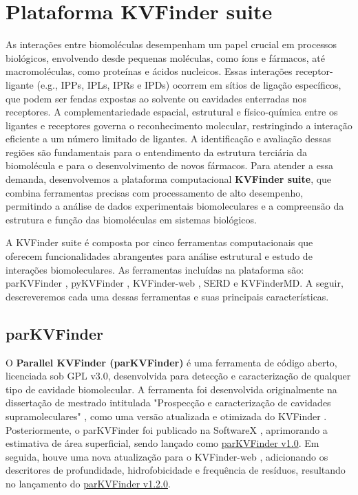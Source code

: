 \documentclass[Portugues]{phdquali}
\def\eg{e.g.\onedot}
\begin{document}

\chapter{Plataforma KVFinder suite \label{sec:kvfinder-suite}}


As interações entre biomoléculas desempenham um papel crucial em processos biológicos, envolvendo desde pequenas moléculas, como íons e fármacos, até macromoléculas, como proteínas e ácidos nucleicos. Essas interações receptor-ligante (\eg, IPPs, IPLs, IPRs e IPDs) ocorrem em sítios de ligação específicos, que podem ser fendas expostas ao solvente ou cavidades enterradas nos receptores. A complementariedade espacial, estrutural e físico-química entre os ligantes e receptores governa o reconhecimento molecular, restringindo a interação eficiente a um número limitado de ligantes. A identificação e avaliação dessas regiões são fundamentais para o entendimento da estrutura terciária da biomolécula e para o desenvolvimento de novos fármacos. Para atender a essa demanda, desenvolvemos a plataforma computacional \textbf{KVFinder suite}, que combina ferramentas precisas com processamento de alto desempenho, permitindo a análise de dados experimentais biomoleculares e a compreensão da estrutura e função das biomoléculas em sistemas biológicos.

A KVFinder suite é composta por cinco ferramentas computacionais que oferecem funcionalidades abrangentes para análise estrutural e estudo de interações biomoleculares. As ferramentas incluídas na plataforma são: parKVFinder \cite{guerra2020}, pyKVFinder \cite{guerra2021}, KVFinder-web \cite{guerra2023A}, SERD e KVFinderMD. A seguir, descreveremos cada uma dessas ferramentas e suas principais características.

\section{parKVFinder}

O \textbf{Parallel KVFinder (parKVFinder)} \cite{guerra2020} é uma ferramenta de código aberto, licenciada sob GPL v3.0, desenvolvida para detecção e caracterização de qualquer tipo de cavidade biomolecular. A ferramenta foi desenvolvida originalmente na dissertação de mestrado intitulada "Prospecção e caracterização de cavidades supramoleculares" \cite{guerra2019}, como uma versão atualizada e otimizada do KVFinder \cite{oliveira2014}. Posteriormente, o parKVFinder foi publicado na SoftwareX \cite{guerra2020}, aprimorando a estimativa de área superficial, sendo lançado como \href{https://github.com/LBC-LNBio/parKVFinder/tree/v1.0}{parKVFinder v1.0}. Em seguida, houve uma nova atualização para o KVFinder-web \cite{guerra2023A}, adicionando os descritores de profundidade, hidrofobicidade e frequência de resíduos, resultando no lançamento do \href{https://github.com/LBC-LNBio/parKVFinder/tree/v1.2.0}{parKVFinder v1.2.0}.
\end{document}
